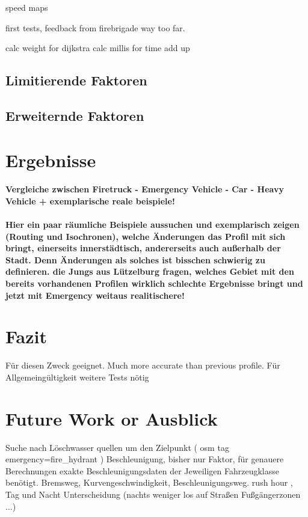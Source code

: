 \documentclass[10pt,a4paper]{article}
\begin{document}
speed maps

first tests, feedback from firebrigade
way too far.

calc weight for dijkstra
calc millis for time add up



\subsection{Limitierende Faktoren}

\subsection{Erweiternde Faktoren}

\section{Ergebnisse}
\paragraph{
Vergleiche zwischen Firetruck - Emergency Vehicle - Car - Heavy Vehicle
+ exemplarische reale beispiele!
}
\paragraph{
\color{red}
Hier ein paar räumliche Beispiele aussuchen und exemplarisch zeigen (Routing und Isochronen), welche Änderungen das Profil mit sich bringt, einerseits innerstädtisch, andererseits auch außerhalb der Stadt. Denn Änderungen als solches ist bisschen schwierig zu definieren. die Jungs aus Lützelburg fragen, welches Gebiet mit den bereits vorhandenen Profilen wirklich schlechte Ergebnisse bringt und jetzt mit Emergency weitaus realitischere!
}

\section{Fazit}

Für diesen Zweck geeignet.
Much more accurate than previous profile. 
Für Allgemeingültigkeit weitere Tests nötig



\section{Future Work or Ausblick}

Suche nach Löschwasser quellen um den Zielpunkt ( osm tag emergency=fire\_hydrant )
Beschleunigung, bisher nur Faktor, für genauere Berechnungen exakte Beschleunigungsdaten der Jeweiligen Fahrzeugklasse benötigt. Bremsweg, Kurvengeschwindigkeit, Beschleunigungsweg.
rush hour , Tag und Nacht Unterscheidung (nachts weniger los auf Straßen\/ Fußgängerzonen ...)

\printbibliography
\end{document}
